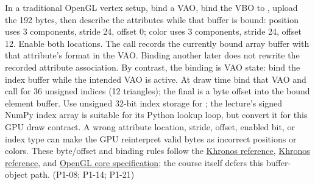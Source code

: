 In a traditional OpenGL vertex setup, bind a VAO, bind the VBO to , upload the 192 bytes, then describe the attributes while that buffer is bound: position uses 3  components, stride 24, offset 0; color uses 3  components, stride 24, offset 12. Enable both locations. The  call records the currently bound array buffer with that attribute's format in the VAO. Binding another  later does not rewrite the recorded attribute association. By contrast, the  binding is VAO state: bind the index buffer while the intended VAO is active. At draw time bind that VAO and call  for 36 unsigned indices (12 triangles); the final  is a byte offset into the bound element buffer. Use unsigned 32-bit index storage for ; the lecture's signed  NumPy index array is suitable for its Python lookup loop, but convert it for this GPU draw contract. A wrong attribute location, stride, offset, enabled bit, or index type can make the GPU reinterpret valid bytes as incorrect positions or colors. These byte/offset and binding rules follow the \href{https://registry.khronos.org/OpenGL-Refpages/gl4/html/glVertexAttribPointer.xhtml}{Khronos  reference}, \href{https://registry.khronos.org/OpenGL-Refpages/gl4/html/glDrawElements.xhtml}{Khronos  reference}, and \href{https://registry.khronos.org/OpenGL/specs/gl/glspec43.core.pdf}{OpenGL core specification}; the course itself defers this buffer-object path. (P1-08; P1-14; P1-21)

